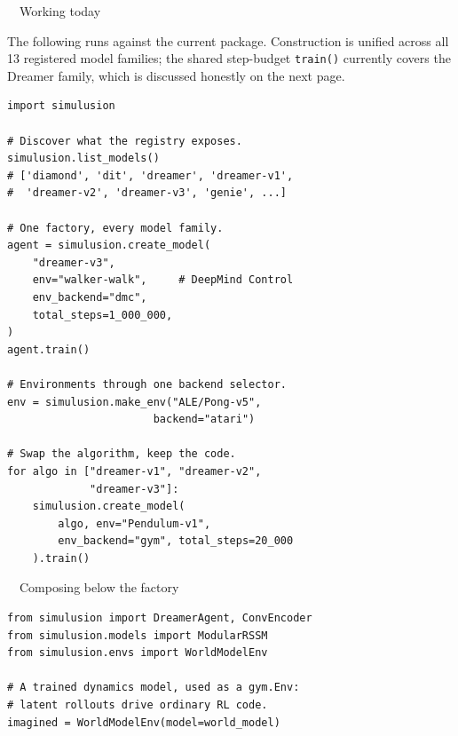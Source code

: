 \documentclass[10pt,a4paper]{article}
\newcommand{\subhead}[1]{{\displayfont\color{ink} #1}\par\vspace{1mm}}
\newcommand{\badge}[3]{\tcbox[on line,boxsep=0pt,left=3pt,right=3pt,top=1.4pt,bottom=1.4pt,
  boxrule=0pt,arc=2pt,colback=#1,coltext=#2]{\scriptsize\displayfont\MakeUppercase{#3}}}
\newcommand{\bimpl}{\badge{greensoft}{green}{implemented}}
\begin{document}
\begin{minipage}[t]{0.485\textwidth}
  \subhead{\bimpl\ \ Working today}
  {\footnotesize The following runs against the current package. Construction is unified across all
  13 registered model families; the shared step-budget \texttt{train()} currently covers the
  Dreamer family, which is discussed honestly on the next page.}
  \vspace{1.5mm}
\begin{lstlisting}
import simulusion

# Discover what the registry exposes.
simulusion.list_models()
# ['diamond', 'dit', 'dreamer', 'dreamer-v1',
#  'dreamer-v2', 'dreamer-v3', 'genie', ...]

# One factory, every model family.
agent = simulusion.create_model(
    "dreamer-v3",
    env="walker-walk",     # DeepMind Control
    env_backend="dmc",
    total_steps=1_000_000,
)
agent.train()

# Environments through one backend selector.
env = simulusion.make_env("ALE/Pong-v5",
                       backend="atari")

# Swap the algorithm, keep the code.
for algo in ["dreamer-v1", "dreamer-v2",
             "dreamer-v3"]:
    simulusion.create_model(
        algo, env="Pendulum-v1",
        env_backend="gym", total_steps=20_000
    ).train()
\end{lstlisting}
  \vspace{1mm}
  {\footnotesize\subhead{\bimpl\ \ Composing below the factory}}
\begin{lstlisting}
from simulusion import DreamerAgent, ConvEncoder
from simulusion.models import ModularRSSM
from simulusion.envs import WorldModelEnv

# A trained dynamics model, used as a gym.Env:
# latent rollouts drive ordinary RL code.
imagined = WorldModelEnv(model=world_model)
\end{lstlisting}
\end{minipage}\hfill
\end{document}
